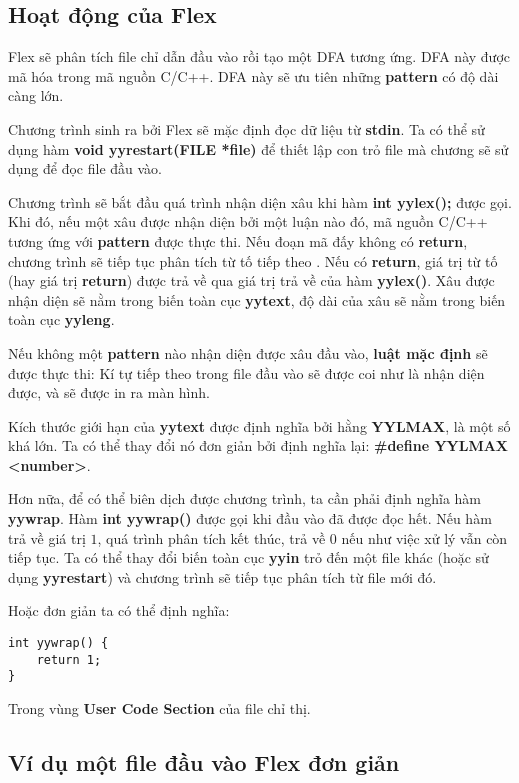 \documentclass[../report.tex]{subfiles}
\begin{document}
\subsection{Hoạt động của Flex}
Flex sẽ phân tích file chỉ dẫn đầu vào rồi tạo một DFA tương ứng. 
DFA này được mã hóa trong mã nguồn C/C++. DFA này sẽ ưu tiên những \textbf{pattern}
có độ dài càng lớn.

Chương trình sinh ra bởi Flex sẽ mặc định đọc dữ liệu từ \textbf{stdin}.
Ta có thể sử dụng hàm \textbf{void yyrestart(FILE *file)} để thiết lập 
con trỏ file mà chương sẽ sử dụng để đọc file đầu vào. 

Chương trình sẽ bắt đầu quá trình nhận diện xâu khi hàm \textbf{int yylex();} được gọi. 
Khi đó, nếu một xâu được nhận diện bởi một luận nào đó, mã nguồn C/C++ tương ứng với \textbf{pattern} được 
thực thi. Nếu đoạn mã đấy không có \textbf{return}, chương trình sẽ tiếp tục phân 
tích từ tố tiếp theo \cite{return-stmt}. Nếu có \textbf{return}, giá trị từ tố (hay giá trị \textbf{return})
được trả về qua giá trị trả về của hàm \textbf{yylex()}.
Xâu được nhận diện sẽ nằm trong biến toàn cục \textbf{yytext}, 
độ dài của xâu sẽ nằm trong biến toàn cục \textbf{yyleng}.

Nếu không một \textbf{pattern} nào nhận diện được xâu đầu vào, 
\textbf{luật mặc định} sẽ được thực thi: Kí tự tiếp theo trong file đầu vào sẽ 
được coi như là nhận diện được, và sẽ được in ra màn hình. 

Kích thước giới hạn của \textbf{yytext} được định nghĩa bởi hằng \textbf{YYLMAX}, 
là một số khá lớn. 
Ta có thể thay đổi nó đơn giản bởi định nghĩa lại: \textbf{\#define YYLMAX <number>}.

Hơn nữa, để có thể biên dịch được chương trình, ta cần phải định nghĩa hàm \textbf{yywrap}.
Hàm \textbf{int yywrap()} được gọi khi đầu vào đã được đọc hết. Nếu hàm trả về giá trị $1$, 
quá trình phân tích kết thúc, trả về 0 nếu như việc xử lý vẫn còn tiếp tục. Ta có thể 
thay đổi biến toàn cục \textbf{yyin} trỏ đến một file khác (hoặc sử dụng \textbf{yyrestart})
và chương trình sẽ tiếp tục phân tích từ file mới đó. \cite{yywrap-yyin}

Hoặc đơn giản ta có thể định nghĩa: 
\begin{lstlisting}
int yywrap() {
    return 1;
}
\end{lstlisting}
Trong vùng \textbf{User Code Section} của file chỉ thị.

\subsection{Ví dụ một file đầu vào Flex đơn giản} 
\end{document}
